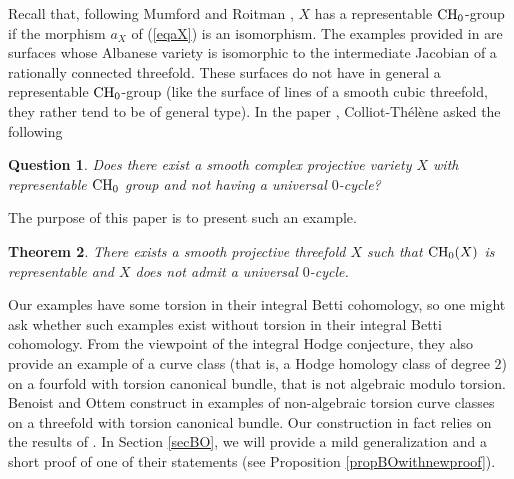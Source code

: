 \documentclass[10pt]{article}
\newtheorem{theo}{Theorem}[section]
\newtheorem{question}[theo]{Question}
\begin{document}
Recall that, following Mumford \cite{mumford} and Roitman \cite{roitman},  $X$ has a representable ${\rm CH}_0$-group if the  morphism $a_X$ of (\ref{eqaX})  is an isomorphism.
The examples provided in \cite{voisincollino} are surfaces whose Albanese variety is isomorphic to the intermediate Jacobian of a rationally connected threefold. These surfaces do not have in general  a representable ${\rm CH}_0$-group (like the surface of lines of  a smooth cubic threefold, they rather tend to be of  general type).
In the paper \cite{colliotTh}, Colliot-Th\'{e}l\`{e}ne asked the following
\begin{question}\label{questionCT}  Does there exist a smooth complex  projective variety $X$ with representable ${\rm CH}_0$ group and not having a universal $0$-cycle?
\end{question}
The purpose of this paper is to present such an example.
\begin{theo}\label{theo} There exists a smooth projective  threefold $X$ such that ${\rm CH}_0(X)$ is representable and $X$ does not admit a universal $0$-cycle.
\end{theo}

Our examples have some torsion in their integral Betti cohomology, so one might ask whether such examples exist  without torsion in their integral Betti cohomology. From the viewpoint of the integral Hodge conjecture, they also provide an example of a curve class (that is, a Hodge homology class of degree $2$) on a fourfold with torsion canonical bundle, that is not algebraic modulo torsion. Benoist and Ottem construct in \cite{benoistOttem} examples of non-algebraic torsion curve classes on a threefold with torsion canonical bundle.
Our construction  in fact relies on the  results of  \cite{benoistOttem}. In Section \ref{secBO}, we will provide a mild generalization and a short proof of one of their statements (see Proposition \ref{propBOwithnewproof}).
\end{document}

